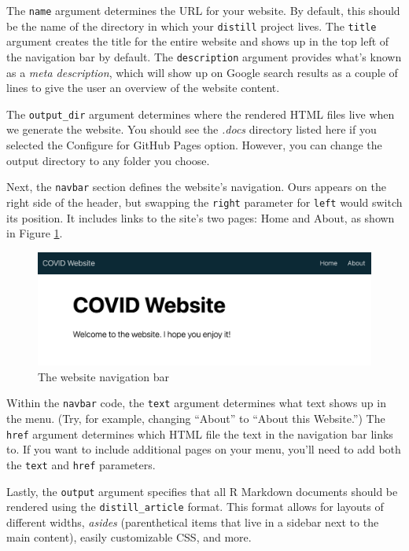 \documentclass[
]{book}
\begin{document}
The \texttt{name} argument determines the URL for your website. By default, this should be the name of the directory in which your \texttt{distill} project lives. The \texttt{title} argument creates the title for the entire website and shows up in the top left of the navigation bar by default. The \texttt{description} argument provides what's known as a \emph{meta description}, which will show up on Google search results as a couple of lines to give the user an overview of the website content.

The \texttt{output\_dir} argument determines where the rendered HTML files live when we generate the website. You should see the \emph{.docs} directory listed here if you selected the Configure for GitHub Pages option. However, you can change the output directory to any folder you choose.

Next, the \texttt{navbar} section defines the website's navigation. Ours appears on the right side of the header, but swapping the \texttt{right} parameter for \texttt{left} would switch its position. It includes links to the site's two pages: Home and About, as shown in Figure \ref{fig:navbar}.

\begin{figure}
\includegraphics[width=1\linewidth]{assets/navbar} \caption{The website navigation bar}\label{fig:navbar}
\end{figure}

Within the \texttt{navbar} code, the \texttt{text} argument determines what text shows up in the menu. (Try, for example, changing ``About'' to ``About this Website.'') The \texttt{href} argument determines which HTML file the text in the navigation bar links to. If you want to include additional pages on your menu, you'll need to add both the \texttt{text} and \texttt{href} parameters.

Lastly, the \texttt{output} argument specifies that all R Markdown documents should be rendered using the \texttt{distill\_article} format. This format allows for layouts of different widths, \emph{asides} (parenthetical items that live in a sidebar next to the main content), easily customizable CSS, and more.
\end{document}
